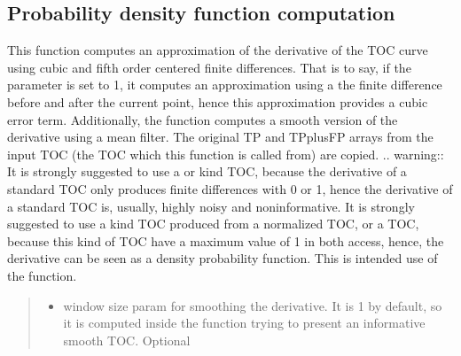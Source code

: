 \documentclass[letterpaper,10pt,english]{sphinxmanual}
\begin{document}
\subsection{Probability density function computation}
\label{\detokenize{usage:probability-density-function-computation}}

\begin{fulllineitems}
\label{\detokenize{usage:ootoc.TOC.density}}
\pysigstartsignatures
{}
\pysigstopsignatures
\sphinxAtStartPar
This function computes an approximation of the derivative of the TOC curve using cubic and fifth order centered finite differences.
That is to say, if the  parameter is set to 1, it computes an approximation using a the finite difference before and after the current point, hence
this approximation provides a cubic error term. Additionally, the function computes a smooth version of the derivative using a mean filter.
The original TP and TPplusFP arrays from the input TOC (the TOC which this function is called from) are copied.
.. warning::
It is strongly suggested to use a  or   kind TOC, because the derivative of a standard TOC only produces finite differences with 0 or 1, hence
the derivative of a standard TOC is, usually, highly noisy and non\sphinxhyphen{}informative. It is strongly suggested to use a  kind TOC produced from a normalized TOC,
or a  TOC, because this kind of TOC have a maximum value of 1 in both access, hence, the derivative can be seen as a density probability function.
This is intended use of the function.
\begin{quote}\begin{description}
\begin{itemize}
\item {} 
\sphinxAtStartPar
{} \textendash{} window size param for smoothing the derivative. It is \sphinxhyphen{}1 by default, so it is computed inside the function trying to present an informative smooth TOC. Optional


\end{itemize}
\end{description}
\end{quote}
\end{fulllineitems}
\end{document}
